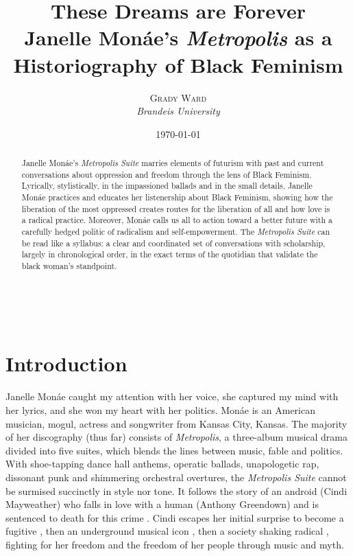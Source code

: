 \documentclass[a4paper, 11pt]{article} %
\title{\textbf{\linespread{2.1}These Dreams are Forever}\\ %
Janelle Mon\'ae's \emph{Metropolis} as a Historiography of Black Feminism} %
\author{\textsc{Grady Ward} %
\\{\textit{Brandeis University}}} %
\date{\today} %
\makeatletter
\renewcommand{\maketitle}{ %
\begin{flushright} %
	{\LARGE\@title} %

	\vspace{40pt} %

	{\large\@author} %
	\\\@date %

	\vspace{30pt} %
\end{flushright}
}
\makeatother
\begin{document}
\maketitle %


\begin{abstract}

Janelle Mon\'ae's \emph{Metropolis Suite} marries elements of futurism with past and current conversations about oppression and freedom through the lens of Black Feminism.
Lyrically, stylistically, in the impassioned ballads and in the small details, Janelle Mon\'ae practices and educates her listenership about Black Feminism, showing how the liberation of the most oppressed creates routes for the liberation of all and how love is a radical practice.
Moreover, Mon\'ae calls us all to action toward a better future with a carefully hedged politic of radicalism and self-empowerment.
The \emph{Metropolis Suite} can be read like a syllabus: a clear and coordinated set of conversations with scholarship, largely in chronological order, in the exact terms of the quotidian that validate the black woman's standpoint.
\end{abstract}

\vspace{30pt}


\section*{Introduction}

Janelle Mon\'ae caught my attention with her voice, she captured my mind with her lyrics, and she won my heart with her politics.
Mon\'ae is an American musician, mogul, actress and songwriter from Kansas City, Kansas.
The majority of her discography (thus far) consists of \emph{Metropolis}, a three-album musical drama divided into five suites, which blends the lines between music, fable and politics.
With shoe-tapping dance hall anthems, operatic ballads, unapologetic rap, dissonant punk and shimmering orchestral overtures, the \emph{Metropolis Suite} cannot be surmised succinctly in style nor tone.
It follows the story of an android (Cindi Mayweather) who falls in love with a human (Anthony Greendown) and is sentenced to death for this crime .
Cindi escapes her initial surprise to become a fugitive , then an underground musical icon , then a society shaking radical , fighting for her freedom and the freedom of her people through music and myth.
\end{document}
